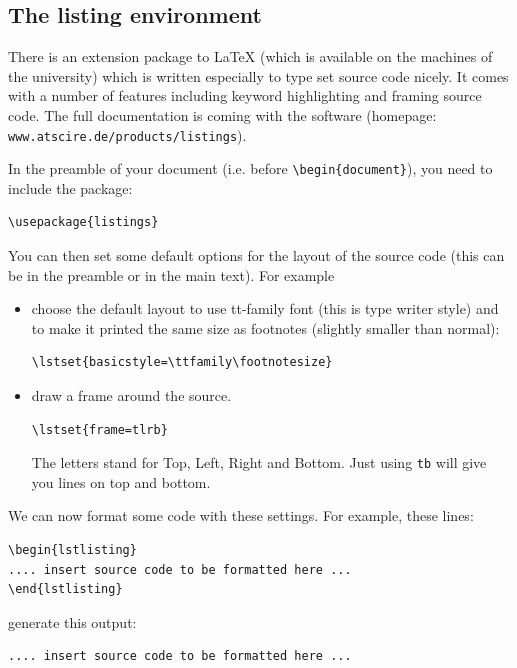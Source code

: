 \documentclass[12pt,a4paper]{article}
\begin{document}
\subsection{The listing environment}
\label{sec:listing}

There is an extension package to LaTeX (which is available on the
machines of the university) which is written especially to type set
source code nicely. It comes with a number of features including
keyword highlighting and framing source code. The full documentation
is coming with the software (homepage:
\texttt{www.atscire.de/products/listings}).

In the preamble of your document (i.e. before
\verb:\begin{document}:), you need to include the package:

\begin{verbatim}
\usepackage{listings}
\end{verbatim}

\lstset{frame=tlrb}
\lstset{basicstyle=\ttfamily\footnotesize}

You can then set some default options for the layout of the source
code (this can be in the preamble or in the main text). For example
\begin{itemize}
\item choose the default layout to use tt-family font (this is type
  writer style) and to make it printed the same size as footnotes
  (slightly smaller than normal):
\begin{verbatim}
\lstset{basicstyle=\ttfamily\footnotesize}
\end{verbatim}

\item draw a frame around the source. 
\begin{verbatim}
\lstset{frame=tlrb}
\end{verbatim}
The letters
stand for Top, Left, Right and Bottom. Just using \texttt{tb} will
give you lines on top and bottom.
\end{itemize}

We can now format some code with these settings. For example, these
lines:
\begin{verbatim}
\begin{lstlisting}
.... insert source code to be formatted here ...
\end{lstlisting}
\end{verbatim}
generate this output:
\begin{lstlisting}
.... insert source code to be formatted here ...
\end{lstlisting}
\end{document}

